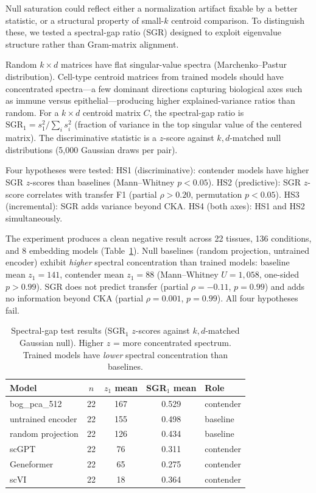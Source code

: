 \documentclass[11pt]{article}
\begin{document}
Null saturation could reflect either a normalization artifact fixable by
a better statistic, or a structural property of small-$k$ centroid
comparison. To distinguish these, we tested a spectral-gap ratio (SGR)
designed to exploit eigenvalue structure rather than Gram-matrix
alignment.

Random $k \times d$ matrices have flat singular-value spectra
(Marchenko--Pastur distribution). Cell-type centroid matrices from
trained models should have concentrated spectra---a few dominant
directions capturing biological axes such as immune versus
epithelial---producing higher explained-variance ratios than random.
For a $k \times d$ centroid matrix $C$, the spectral-gap ratio is
$\mathrm{SGR}_1 = s_1^2 / \sum_i s_i^2$ (fraction of variance in the
top singular value of the centered matrix). The discriminative
statistic is a $z$-score against $k,d$-matched null distributions
(5,000 Gaussian draws per pair).

Four hypotheses were tested: HS1
(discriminative): contender models have higher SGR $z$-scores than
baselines (Mann--Whitney $p < 0.05$). HS2 (predictive): SGR $z$-score
correlates with transfer F1 (partial $\rho > 0.20$, permutation
$p < 0.05$). HS3 (incremental): SGR adds variance beyond CKA. HS4
(both axes): HS1 and HS2 simultaneously.

The experiment produces a clean negative result across 22 tissues,
136 conditions, and 8 embedding models (Table~\ref{tab:sgr}). Null
baselines (random projection, untrained encoder) exhibit \emph{higher}
spectral concentration than trained models: baseline mean $z_1 = 141$,
contender mean $z_1 = 88$ (Mann--Whitney $U = 1{,}058$, one-sided
$p > 0.99$). SGR does not predict transfer (partial $\rho = -0.11$,
$p = 0.99$) and adds no information beyond CKA (partial
$\rho = 0.001$, $p = 0.99$). All four hypotheses fail.

\medskip
\medskip
\begin{table}[h!]
\centering
\caption{Spectral-gap test results (SGR$_1$ $z$-scores against
$k,d$-matched Gaussian null). Higher $z$ = more concentrated spectrum.
Trained models have \emph{lower} spectral concentration than
baselines.}
\label{tab:sgr}
\small
\begin{tabular}{@{}lcccl@{}}
\toprule
Model & $n$ & $z_1$ mean & SGR$_1$ mean & Role \\
\midrule
bog\_pca\_512           & 22 & 167 & 0.529 & contender \\
untrained encoder       & 22 & 155 & 0.498 & baseline \\
random projection       & 22 & 126 & 0.434 & baseline \\
scGPT                   & 22 & 76  & 0.311 & contender \\
Geneformer              & 22 & 65  & 0.275 & contender \\
scVI                    & 22 & 18  & 0.364 & contender \\
\bottomrule
\end{tabular}
\end{table}
\end{document}
